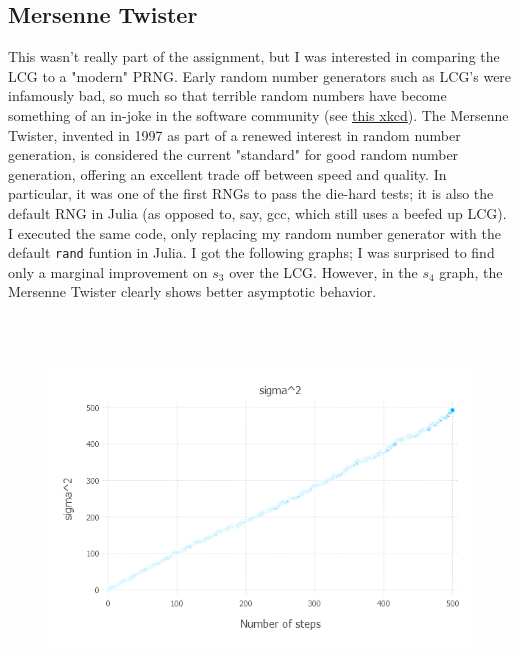 \documentclass{article}
\begin{document}
\subsection{Mersenne Twister}
This wasn't really part of the assignment, but I was interested in comparing the LCG to a "modern" PRNG. Early random number generators such as LCG's were infamously bad, so much so that terrible random numbers have become something of an in-joke in the software community (see \href{https://xkcd.com/221/}{this xkcd}). The Mersenne Twister, invented in 1997 as part of a renewed interest in random number generation, is considered the current "standard" for good random number generation, offering an excellent trade off between speed and quality. In particular, it was one of the first RNGs to pass the die-hard tests; it is also the default RNG in Julia (as opposed to, say, gcc, which still uses a beefed up LCG). I executed the same code, only replacing my random number generator with the default \verb|rand| funtion in Julia. I got the following graphs; I was surprised to find only a marginal improvement on $s_3$ over the LCG. However, in the $s_4$ graph, the Mersenne Twister clearly shows better asymptotic behavior.
\begin{figure}[H]
	\includegraphics[width=6in,height=4in]{"sq_mt"}
\end{figure}
\end{document}
